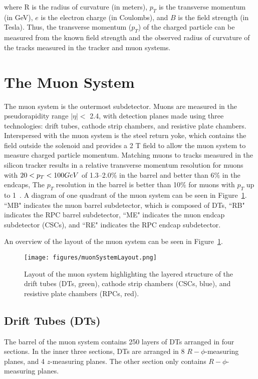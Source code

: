 \noindent where R is the radius of curvature (in meters), $p_{T}$ is the transverse momentum (in GeV), $e$ is the electron charge (in Coulombs), and $B$ is the field strength (in Tesla). Thus, the transverse momentum ($p_{T}$) of the charged particle can be measured from the known field strength and the observed radius of curvature of the tracks measured in the tracker and muon systems\cite{TDR}.

\section{The Muon System}

The muon system is the outermost subdetector. Muons are measured in the pseudorapidity range $|\eta| <$ 2.4, with detection planes made using three technologies: drift tubes, cathode strip chambers, and resistive plate chambers. Interspersed with the muon system is the steel return yoke, which contains the field outside the solenoid and provides a 2 T field to allow the muon system to measure charged particle momentum. Matching muons to tracks measured in the silicon tracker results in a relative transverse momentum resolution for muons with $20 < p_T < 100 GeV$ of 1.3--2.0\% in the barrel and better than 6\% in the endcaps, The $p_T$ resolution in the barrel is better than 10\% for muons with $p_T$ up to 1\TeV~\cite{Chatrchyan:2012xi}. A diagram of one quadrant of the muon system can be seen in Figure~\ref{fig:muonSystemLayout}. ``MB" indicates the muon barrel subdetector, which is composed of DTs, ``RB" indicates the RPC barrel subdetector, ``ME" indicates the muon endcap subdetector (CSCs), and ``RE" indicates the RPC endcap subdetector. 

An overview of the layout of the muon system can be seen in Figure~\ref{fig:muonSystemLayout}.

\begin{figure}\centering
  \texttt{[image: figures/muonSystemLayout.png]}
  \caption{\label{fig:muonSystemLayout} Layout of the muon system highlighting the layered structure of the drift tubes (DTs, green), cathode strip chambers (CSCs, blue), and resistive plate chambers (RPCs, red).}
\end{figure}

\subsection{Drift Tubes (DTs)}

The barrel of the muon system contains 250 layers of DTs arranged in four sections. In the inner three sections, DTs are arranged in 8 $R-\phi$-measuring planes, and 4 $z$-measuring planes. The other section only contains $R-\phi$-measuring planes.

